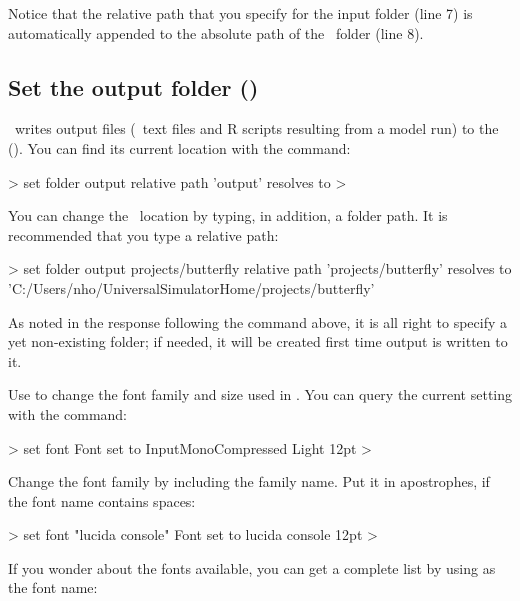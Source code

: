 Notice that the relative path that you specify for the input folder (line 7) is automatically appended to the absolute path of the \ushome\ folder (line 8).

\subsection{Set the output folder (\outputfolder)}
\US\ writes output files (\eg\ text files and R scripts resulting from a model run) to the  (\outputfolder). You can find its current location with the  command:

\begin{usdialog}
> set folder output
relative path 'output' resolves to %
> 
\end{usdialog}

You can change the \outputfolder\ location by typing, in addition, a folder path. It is recommended that you type a relative path:

\begin{usdialog}
> set folder output projects/butterfly
relative path 'projects/butterfly' resolves to %
  'C:/Users/nho/UniversalSimulatorHome/projects/butterfly' %
\end{usdialog}

As noted in the response following the command above, it is all right to specify a yet non-existing folder; if needed, it will be created first time output is written to it.

Use  to change the font family and size used in \US. You can query the current setting with the  command:

\begin{usdialog}
> set font
Font set to InputMonoCompressed Light 12pt
>\end{usdialog}

Change the font family by including the family name. Put it in apostrophes, if the font name contains spaces:

\begin{usdialog}
> set font "lucida console"
Font set to lucida console 12pt %
> 
\end{usdialog}

If you wonder about the fonts available, you can get a complete list by using  as the font name:

